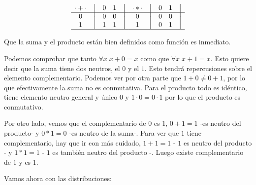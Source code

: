 \begin{equation}
    \begin{matrix}
        {\cdot + \cdot} & \big{\vert} & {0} & {1} & \big{\vert} \\
        \hline
        {0}             & \big{\vert} & {0} & {0} & \big{\vert} \\
        {1}             & \big{\vert} & {1} & {1} & \big{\vert} \\
        \hline
    \end{matrix}
    \quad
    \begin{matrix}
        {\cdot * \cdot} & \big{\vert} & {0} & {1} & \big{\vert} \\
        \hline
        {0}                   & \big{\vert} & {0} & {0} & \big{\vert} \\
        {1}                   & \big{\vert} & {0} & {1} & \big{\vert} \\
        \hline
    \end{matrix}
\end{equation}



	Que la suma y el producto están bien definidos como función es inmediato.



	Podemos comprobar que tanto \(\forall x \; x + 0 = x\) como que \(\forall
x \; x + 1 = x\). Esto quiere decir que la suma tiene dos neutros, el \(0\) y
el \(1\). Esto tendrá repercusiones sobre el elemento complementario. Podemos
ver por otra parte que \(1 + 0 \neq 0 + 1\), por lo que efectivamente la suma
no es conmutativa. Para el producto todo es idéntico, tiene elemento neutro
general y único \(0\) y \(1\cdot 0 = 0\cdot 1\) por lo que el producto es
conmutativo.



	Por otro lado, vemos que el complementario de \(0\) es \(1\), \(0 + 1 =
1\) -es neutro del producto- y \(0 * 1 = 0\) -es neutro de la suma-. Para ver
que \(1\) tiene complementario, hay que ir con más cuidado, \(1 + 1 = 1\) -
\(1\) es neutro del producto - y \(1 * 1 = 1\) - \(1\) es también neutro del
producto -. Luego existe complementario de \(1\) y es \(1\).



	Vamos ahora con las distribuciones:



